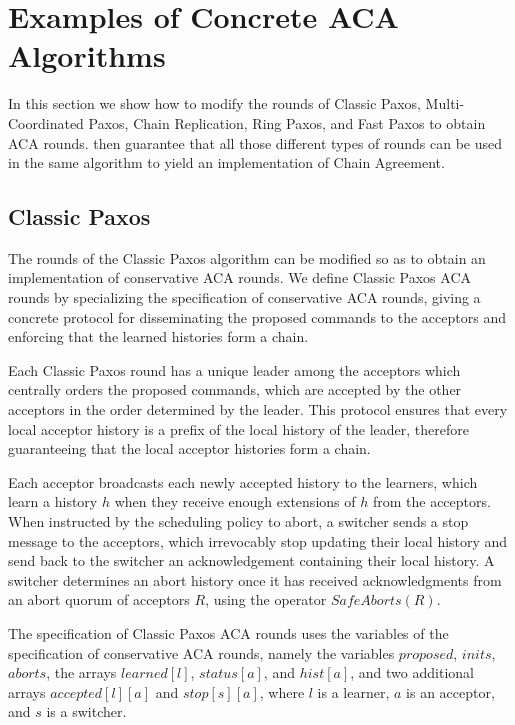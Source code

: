 \section{Examples of Concrete ACA Algorithms}
\label{sec:examples}

In this section we show how to modify the rounds of Classic Paxos,
Multi-Coordinated Paxos, Chain Replication, Ring Paxos, and Fast Paxos to obtain
ACA rounds.  then guarantee that all those different types of
rounds can be used in the same algorithm to yield an implementation of Chain
Agreement.

\subsection{Classic Paxos}

The rounds of the Classic Paxos algorithm can be modified so as to
obtain an implementation of conservative ACA rounds.  We define
Classic Paxos ACA rounds by specializing the specification of
conservative ACA rounds, giving a concrete protocol for disseminating
the proposed commands to the acceptors and enforcing that the learned
histories form a chain.

Each Classic Paxos round has a unique leader among the acceptors which
centrally orders the proposed commands, which are accepted by the
other acceptors in the order determined by the leader.  This protocol
ensures that every local acceptor history is a prefix of the local
history of the leader, therefore guaranteeing that the local acceptor histories
form a chain.

Each acceptor broadcasts each newly accepted history to the learners, which
learn a history $h$ when they receive enough extensions of $h$ from the
acceptors.  When instructed by the scheduling policy to abort, a
switcher sends a stop message to the acceptors, which irrevocably stop
updating their local history and send back to the switcher an
acknowledgement containing their local history. A switcher
determines an abort history once it has received acknowledgments from
an abort quorum of acceptors $R$, using the operator $SafeAborts\left(
R \right)$.

The specification of Classic Paxos ACA rounds uses the variables of
the specification of conservative ACA rounds, namely the variables
$proposed$, $inits$, $aborts$, the arrays $learned\left[ l \right]$,
$status\left[ a \right]$, and $hist\left[ a \right]$, and two
additional arrays $accepted\left[ l \right]\left[ a \right]$ and
$stop\left[ s \right]\left[ a \right]$, where $l$ is a learner, $a$ is
an acceptor, and $s$ is a switcher.

